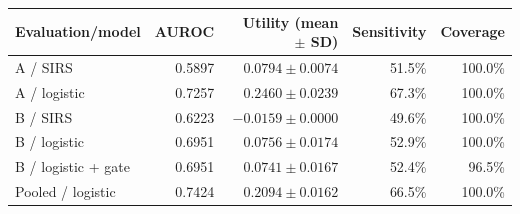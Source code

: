 \begin{tabular}{@{}lrrrr@{}}
\toprule
Evaluation/model & AUROC & Utility (mean $\pm$ SD) & Sensitivity & Coverage\\
\midrule
A / SIRS & 0.5897 & $0.0794\pm0.0074$ & 51.5\% & 100.0\%\\
A / logistic & 0.7257 & $0.2460\pm0.0239$ & 67.3\% & 100.0\%\\
B / SIRS & 0.6223 & $-0.0159\pm0.0000$ & 49.6\% & 100.0\%\\
B / logistic & 0.6951 & $0.0756\pm0.0174$ & 52.9\% & 100.0\%\\
B / logistic + gate & 0.6951 & $0.0741\pm0.0167$ & 52.4\% & 96.5\%\\
Pooled / logistic & 0.7424 & $0.2094\pm0.0162$ & 66.5\% & 100.0\%\\
\bottomrule
\end{tabular}
